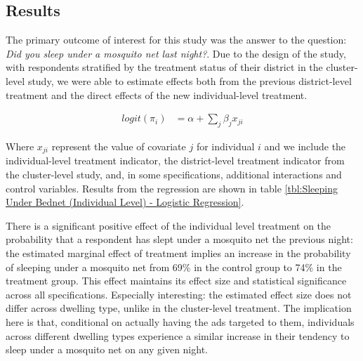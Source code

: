 \documentclass[a4paper,12pt]{article}
\theoremstyle{proposition}
\begin{document}

\subsection{Results}

The primary outcome of interest for this study was the answer to the question: \textit{Did you sleep under a mosquito net last night?}. Due to the design of the study, with respondents stratified by the treatment status of their district in the cluster-level study, we were able to estimate effects both from the previous district-level treatment and the direct effects of the new individual-level treatment.


\begin{align*}
  logit(\pi_{i}) &= \alpha + \sum_j \beta_j x_{ji}
\end{align*}

Where $x_{ji}$ represent the value of covariate $j$ for individual $i$ and we include the individual-level treatment indicator, the district-level treatment indicator from the cluster-level study, and, in some specifications, additional interactions and control variables. Results from the regression are shown in table \ref{tbl:Sleeping Under Bednet (Individual Level) - Logistic Regression}.

There is a significant positive effect of the individual level treatment on the probability that a respondent has slept under a mosquito net the previous night: the estimated marginal effect of treatment implies an increase in the probability of sleeping under a mosquito net from 69\% in the control group to 74\% in the treatment group. This effect maintains its effect size and statistical significance across all specifications. Especially interesting: the estimated effect size does not differ across dwelling type, unlike in the cluster-level treatment. The implication here is that, conditional on actually having the ads targeted to them, individuals across different dwelling types experience a similar increase in their tendency to sleep under a mosquito net on any given night.






\clearpage
\printbibliography
\end{document}
